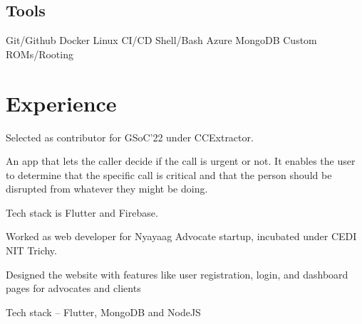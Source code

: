 \documentclass[]{deedy-resume-openfont}
\begin{document}
\begin{minipage}[t]{0.3\textwidth}
\subsection{Tools}
Git/Github  \textbullet{} Docker \textbullet{} Linux \textbullet{} CI/CD
\textbullet{} Shell/Bash \textbullet{} Azure \textbullet{} MongoDB \textbullet{}
Custom ROMs/Rooting \\ 

%
%

\end{minipage} 
\hfill
\begin{minipage}[t]{0.69\textwidth} 

%
%
\section{Experience}
\hfill {}
\begin{tightemize}
    \item Selected as contributor for GSoC'22 under CCExtractor.
    \item An app that lets the caller decide if the call is urgent or not. It enables the user to determine that the specific call is critical and that the person should be disrupted from whatever they might be doing.
	\item Tech stack is Flutter and Firebase.
\end{tightemize}
\sectionsep

\hfill {}
\begin{tightemize}
    \item Worked as web developer for Nyayaag Advocate startup, incubated under CEDI NIT Trichy.
    \item Designed the website with features like user registration, login, and dashboard pages for advocates and clients
	\item Tech stack – Flutter, MongoDB and NodeJS
\end{tightemize}

\sectionsep

%
%

\end{minipage}
\end{document}
